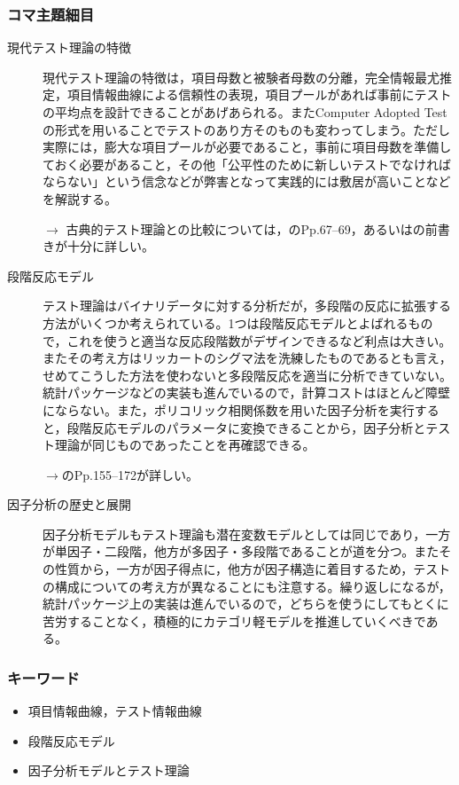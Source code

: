 \subsubsection{コマ主題細目}
\begin{description}
	\item[現代テスト理論の特徴]現代テスト理論の特徴は，項目母数と被験者母数の分離，完全情報最尤推定，項目情報曲線による信頼性の表現，項目プールがあれば事前にテストの平均点を設計できることがあげあられる。またComputer Adopted Testの形式を用いることでテストのあり方そのものも変わってしまう。ただし実際には，膨大な項目プールが必要であること，事前に項目母数を準備しておく必要があること，その他「公平性のために新しいテストでなければならない」という信念などが弊害となって実践的には敷居が高いことなどを解説する。

	      \begin{flushright}
		      $\to$ 古典的テスト理論との比較については，\citet{Katoken2014}のPp.67--69，あるいは\citet{Toyoda20120824}の前書きが十分に詳しい。
	      \end{flushright}


	\item[段階反応モデル] テスト理論はバイナリデータに対する分析だが，多段階の反応に拡張する方法がいくつか考えられている。1つは段階反応モデルとよばれるもので，これを使うと適当な反応段階数がデザインできるなど利点は大きい。またその考え方はリッカートのシグマ法を洗練したものであるとも言え，せめてこうした方法を使わないと多段階反応を適当に分析できていない。統計パッケージなどの実装も進んでいるので，計算コストはほとんど障壁にならない。また，ポリコリック相関係数を用いた因子分析を実行すると，段階反応モデルのパラメータに変換できることから，因子分析とテスト理論が同じものであったことを再確認できる。

	      \begin{flushright}
		      $\to$\citet{Toyoda20120824}のPp.155--172が詳しい。
	      \end{flushright}

	\item[因子分析の歴史と展開]  因子分析モデルもテスト理論も潜在変数モデルとしては同じであり，一方が単因子・二段階，他方が多因子・多段階であることが道を分つ。またその性質から，一方が因子得点に，他方が因子構造に着目するため，テストの構成についての考え方が異なることにも注意する。繰り返しになるが，統計パッケージ上の実装は進んでいるので，どちらを使うにしてもとくに苦労することなく，積極的にカテゴリ軽モデルを推進していくべきである。
\end{description}
\subsubsection{キーワード}
\begin{itemize}
	\item 項目情報曲線，テスト情報曲線
	\item 段階反応モデル
	\item 因子分析モデルとテスト理論
\end{itemize}
